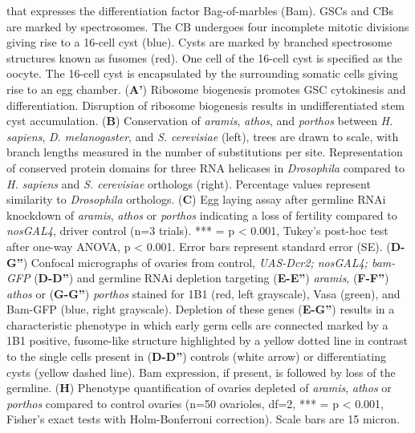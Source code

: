 \documentclass[12pt,oneside]{reedthesis}
\begin{document}
that expresses the differentiation factor Bag-of-marbles (Bam). GSCs and
CBs are marked by spectrosomes. The CB undergoes four incomplete mitotic
divisions giving rise to a 16-cell cyst (blue). Cysts are marked by
branched spectrosome structures known as fusomes (red). One cell of the
16-cell cyst is specified as the oocyte. The 16-cell cyst is
encapsulated by the surrounding somatic cells giving rise to an egg
chamber. (\textbf{A'}) Ribosome biogenesis promotes GSC cytokinesis and
differentiation. Disruption of ribosome biogenesis results in
undifferentiated stem cyst accumulation. (\textbf{B}) Conservation of
\emph{aramis}, \emph{athos}, and \emph{porthos} between \emph{H. sapiens}, \emph{D.
melanogaster}, and \emph{S. cerevisiae} (left), trees are drawn to scale,
with branch lengths measured in the number of substitutions per site.
Representation of conserved protein domains for three RNA helicases in
\emph{Drosophila} compared to \emph{H. sapiens} and \emph{S. cerevisiae} orthologs
(right). Percentage values represent similarity to \emph{Drosophila}
orthologs. (\textbf{C}) Egg laying assay after germline RNAi knockdown of
\emph{aramis}, \emph{athos} or \emph{porthos} indicating a loss of fertility compared
to \emph{nosGAL4}, driver control (n=3 trials). *** = p \textless{} 0.001, Tukey's
post-hoc test after one-way ANOVA, p \textless{} 0.001. Error bars represent
standard error (SE). (\textbf{D-G''}) Confocal micrographs of ovaries from
control, \emph{UAS-Dcr2; nosGAL4; bam-GFP} (\textbf{D-D''}) and germline RNAi
depletion targeting (\textbf{E-E''}) \emph{aramis}, (\textbf{F-F''}) \emph{athos} or
(\textbf{G-G''}) \emph{porthos} stained for 1B1 (red, left grayscale), Vasa
(green), and Bam-GFP (blue, right grayscale). Depletion of these genes
(\textbf{E-G''}) results in a characteristic phenotype in which early germ
cells are connected marked by a 1B1 positive, fusome-like structure
highlighted by a yellow dotted line in contrast to the single cells
present in (\textbf{D-D''}) controls (white arrow) or differentiating cysts
(yellow dashed line). Bam expression, if present, is followed by loss of
the germline. (\textbf{H}) Phenotype quantification of ovaries depleted of
\emph{aramis}, \emph{athos} or \emph{porthos} compared to control ovaries (n=50
ovarioles, df=2, *** = p \textless{} 0.001, Fisher's exact tests with
Holm-Bonferroni correction). Scale bars are 15 micron.

\textbf{\hfill\break
}
\end{document}

